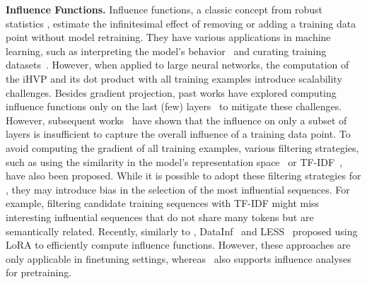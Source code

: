 \textbf{Influence Functions.\hspace{2.5mm}} Influence functions, a classic concept from robust statistics \cite{hampel1974influence}, estimate the infinitesimal effect of removing or adding a training data point without model retraining. They have various applications in machine learning, such as interpreting the model's behavior~\cite{han2020explaining,park2023trak,grosse2023studying} and curating training datasets~\cite{liu2021influence,engstrom2024dsdm}. However, when applied to large neural networks, the computation of the iHVP and its dot product with all training examples introduce scalability challenges. Besides gradient projection, past works have explored computing influence functions only on the last (few) layers~\cite{koh2017understanding,schioppa2022scaling} to mitigate these challenges. However, subsequent works~\cite{feldman2020neural,grosse2023studying} have shown that the influence on only a subset of layers is insufficient to capture the overall influence of a training data point. To avoid computing the gradient of all training examples, various filtering strategies, such as using the similarity in the model's representation space~\cite{guo2020fastif} or TF-IDF~\cite{yeh2022first,grosse2023studying}, have also been proposed. While it is possible to adopt these filtering strategies for \method, they may introduce bias in the selection of the most influential sequences. For example, filtering candidate training sequences with TF-IDF might miss interesting influential sequences that do not share many tokens but are semantically related. Recently, similarly to \method, DataInf~\cite{kwon2024datainf} and LESS~\cite{xia2024less} proposed using LoRA to efficiently compute influence functions. However, these approaches are only applicable in finetuning settings, whereas \method\ also supports influence analyses for pretraining. 



